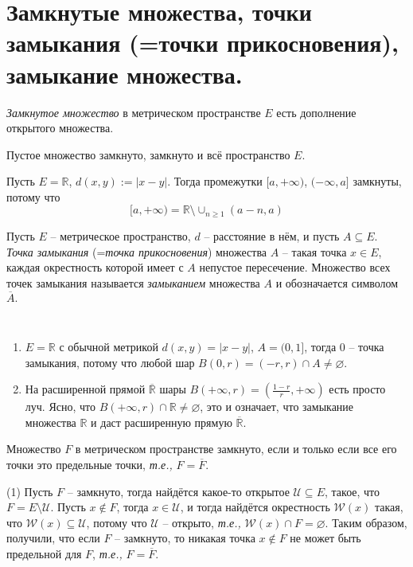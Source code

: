 \section{Замкнутые множества, точки замыкания (=точки прикосновения), замыкание множества.}

\begin{definition}
    \textit{Замкнутое множество} в метрическом пространстве $E$ есть дополнение открытого множества. 
\end{definition}

Пустое множество замкнуто, замкнуто и всё пространство $E$.

\begin{example}
    Пусть $E = \mathbb{R}$, $d(x,y):= |x-y|$. Тогда промежутки $[a, + \infty)$, $(- \infty,a]$ замкнуты, потому что 
    \[
     [a, + \infty) = \mathbb{R} \setminus \cup_{n \ge 1} (a-n, a)
    \]
\end{example}





\begin{definition}\label{limit_point_in_metric}
  Пусть $E$ -- метрическое пространство, $d$ -- расстояние в нём, и пусть $A \subseteq E$. \textit{Точка замыкания} (=\textit{точка прикосновения}) множества $A$ -- такая точка $x \in E$, каждая окрестность которой имеет с $A$ непустое пересечение. Множество всех точек замыкания называется \textit{замыканием} множества $A$ и обозначается символом $\overline{A}.$
\end{definition}

\begin{example}~
    \begin{enumerate}
        \item $E= \mathbb{R}$ с обычной метрикой $d(x,y) = |x-y|$, $A = (0,1]$, тогда $0$ -- точка замыкания, потому что любой шар $B(0,r) = (-r,r) \cap A \ne \varnothing$.
        \item На расширенной прямой $\overline{\mathbb{R}}$ шары $B(+\infty, r) = (\frac{1-r}{r}, +\infty)$ есть просто луч. Ясно, что $B(+\infty, r)\cap \mathbb{R} \ne \varnothing$, \ie это и означает, что замыкание множества $\mathbb{R}$ и даст расширенную прямую $\overline{\mathbb{R}}.$
    \end{enumerate}
\end{example}

\begin{lemma}\label{closure_in_metric}
    Множество $F$ в метрическом пространстве замкнуто, если и только если все его точки это предельные точки, \textit{т.е.,} $F = \overline{F}.$ 
\end{lemma}
(1) Пусть $F$ -- замкнуто, тогда найдётся какое-то открытое $\mathscr{U} \subseteq E$, такое, что $F  = E \setminus \mathscr{U}$. Пусть $x \notin F$, тогда $x \in \mathscr{U}$, и тогда найдётся окрестность $\mathscr{W}(x)$ такая, что $\mathscr{W}(x) \subseteq \mathscr{U}$, потому что $\mathscr{U}$ -- открыто, \textit{т.е.,} $\mathscr{W}(x) \cap F = \varnothing.$ Таким образом, получили, что если $F$ -- замкнуто, то никакая точка $x \notin F$ не может быть предельной для $F$, \textit{т.е.,} $F = \overline{F}.$ 


